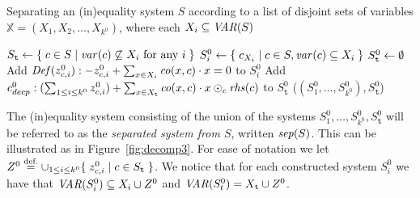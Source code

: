 \begin{algorithm}\caption{Separating an (in)equality system $S$ according to a list of disjoint sets of variables $\mathbb{X}=(X_1, X_2, \ldots, X_{k^0})$, where each $X_i\subseteq \mathit{VAR}(S)$}\label{alg:separate}
\begin{algorithmic}
\State $S_{\texttt{t}} \gets \{\;{c\in S}\;|\;{\mathit{var}(c)\not\subseteq X_i\text{ for any } i}\;\}$
	\State $S^0_i \gets \{\;{c_{X_i}}\;|\;{c\in S, \mathit{var}(c)\subseteq X_i}\;\}$%
\EndFor
\State $S^0_{\texttt{t}}\gets \emptyset$ %
		\State Add $\mathit{Def}(z^0_{c,i}): -z^{0}_{c,i} + \sum_{x\in X_i} \mathit{co}(x,c)\cdot x = 0$ to $S_i^0$
	\EndFor
	\State Add $c^0_{decp}: (\sum_{1\leq i\leq k^0} z_{c,i}^0) +\sum_{x\in X_\texttt{t}}\mathit{co}(x,c)\cdot x \odot_c \mathit{rhs}(c)$ to $S^0_\texttt{t}$ 
\EndFor
\State\Return ($(S^0_1,\ldots, S^0_{k^0}), S^0_\texttt{t}$)
\EndFunction
\end{algorithmic}
\end{algorithm}
The (in)equality system consisting of the union of the systems $S^0_1,\ldots, S^0_{k^0}, S^0_\texttt{t}$ will be referred to as the \emph{separated system from $S$}, written $\mathit{sep}(S)$. This can be illustrated as in Figure~\ref{fig:decomp3}. For ease of notation we let $Z^0 \overset{\text{def.}}= \cup_{1\leq i\leq k^0}\{\;{z^0_{c,i}}\;|\;{c\in S_{\texttt{t}}}\;\}$. We notice that for each constructed system $S^0_i$ we have that $\mathit{VAR}(S^0_i)\subseteq X_i\cup Z^0$ and $\mathit{VAR}(S^0_t) = X_{\texttt{t}} \cup Z^0$. 

